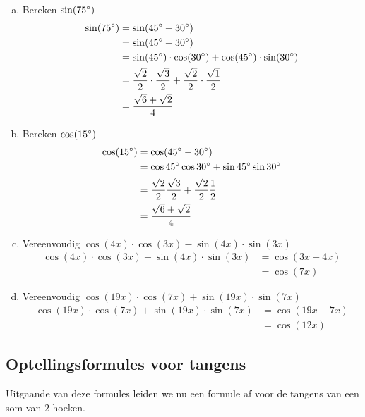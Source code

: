 \documentclass[a4paper,12pt]{article}
\begin{document}
\begin{theorie}
\begin{enumerate}[(a)]
  \item Bereken $\sin(75^\circ)$
  \vspace*{-0.2cm}
  \begin{align*}
    \sin(75^\circ)&=\sin(45^\circ+30^\circ)\\
                   &=\sin(45^\circ+30^\circ)\\
                   &=\sin(45^\circ)\cdot \cos(30^\circ)+\cos(45^\circ)\cdot \sin(30^\circ)\\
                   &=\frac{\sqrt{2}}{2}\cdot \frac{\sqrt{3}}{2}+\frac{\sqrt{2}}{2}\cdot\frac{\sqrt{1}}{2}\\
                   &=\frac{\sqrt{6}+\sqrt{2}}{4}
  \end{align*}
  \item Bereken $\cos(15^\circ)$
  \vspace*{-0.2cm}
  \begin{align*}
    \cos(15^\circ)&= \cos(45^\circ-30^\circ)\\
                   &= \cos 45^\circ \cos 30^\circ + \sin 45^\circ \sin 30^\circ\\
                   &= \dfrac{\sqrt{2}}{2}\dfrac{\sqrt{3}}{2} + \dfrac{\sqrt{2}}{2}\dfrac{1}{2}\\
                   &= \dfrac{\sqrt{6} +\sqrt{2}}{4}
  \end{align*}
  \item Vereenvoudig $\cos(4x)\cdot \cos(3x)-\sin(4x)\cdot \sin(3x)$
  \vspace*{-0.2cm}
  \begin{align*}
    \cos(4x)\cdot \cos(3x)-\sin(4x)\cdot \sin(3x)&=\cos(3x+4x)\\
                                                 &=\cos(7x)
  \end{align*}
  \item Vereenvoudig $\cos(19x)\cdot \cos(7x)+\sin(19x)\cdot \sin(7x)$
  \vspace*{-0.2cm}
  \begin{align*}
    \cos(19x)\cdot \cos(7x)+\sin(19x)\cdot \sin(7x)&=\cos(19x-7x)\\
                                                 &=\cos(12x)
  \end{align*}
\end{enumerate}

\pagebreak
\subsection{Optellingsformules voor tangens}
Uitgaande van deze formules leiden we nu een formule af voor de tangens van een som van 2 hoeken.


\end{theorie}
\end{document}
